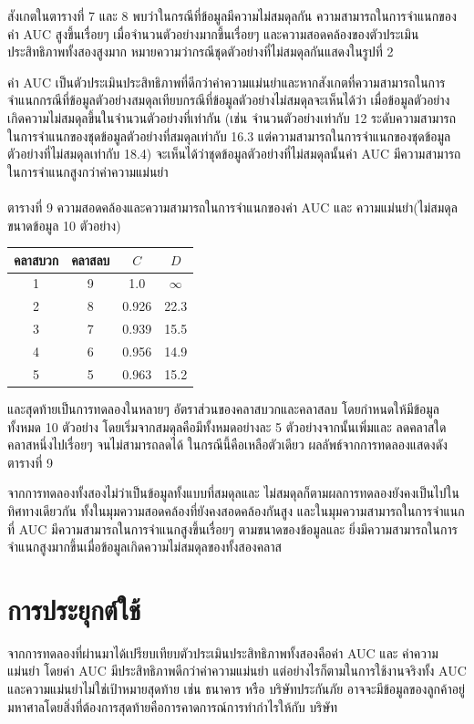 \documentclass[twoside, twocolumn, 12pt]{article}
\begin{document}
สังเกตในตารางที่ 7 และ 8 พบว่าในกรณีที่ข้อมูลมีความไม่สมดุลกัน ความสามารถในการจำแนกของค่า AUC สูงขึ้นเรื่อยๆ เมื่อจำนวนตัวอย่างมากขึ้นเรื่อยๆ และความสอดคล้องของตัวประเมินประสิทธิภาพทั้งสองสูงมาก หมายความว่ากรณีชุดตัวอย่างที่ไม่สมดุลกันแสดงในรูปที่ 2 

ค่า AUC เป็นตัวประเมินประสิทธิภาพที่ดีกว่าค่าความแม่นยำและหากสังเกตที่ความสามารถในการจำแนกกรณีที่ข้อมูลตัวอย่างสมดุลเทียบกรณีที่ข้อมูลตัวอย่างไม่สมดุลจะเห็นได้ว่า เมื่อข้อมูลตัวอย่างเกิดความไม่สมดุลขึ้นในจำนวนตัวอย่างที่เท่ากัน (เช่น จำนวนตัวอย่างเท่ากับ 12 ระดับความสามารถในการจำแนกของชุดข้อมูลตัวอย่างที่สมดุลเท่ากับ 16.3 แต่ความสามารถในการจำแนกของชุดข้อมูลตัวอย่างที่ไม่สมดุลเท่ากับ 18.4) จะเห็นได้ว่าชุดข้อมูลตัวอย่างที่ไม่สมดุลนั้นค่า AUC มีความสามารถในการจำแนกสูงกว่าค่าความแม่นยำ
\\\\
ตารางที่ 9 ความสอดคล้องและความสามารถในการจำแนกของค่า AUC และ ความแม่นยำ(ไม่สมดุล ขนาดข้อมูล 10 ตัวอย่าง)
\begin{center}
\begin{tabular}{|cccc|}
\hline
คลาสบวก & คลาสลบ & $C$ & $D$\\
\hline
1&9&1.0 &$\infty$\\\hline
2&8&0.926&22.3\\\hline
3&7&0.939&15.5\\\hline
4&6&0.956&14.9\\\hline
5&5&0.963&15.2\\\hline
\end{tabular}
\end{center}

และสุดท้ายเป็นการทดลองในหลายๆ อัตราส่วนของคลาสบวกและคลาสลบ โดยกำหนดให้มีข้อมูลทั้งหมด 10 ตัวอย่าง โดยเริ่มจากสมดุลคือมีทั้งหมดอย่างละ 5 ตัวอย่างจากนั้นเพิ่มและ ลดคลาสใดคลาสหนึ่งไปเรื่อยๆ จนไม่สามารถลดได้ ในกรณีนี้คือเหลือตัวเดียว ผลลัพธ์จากการทดลองแสดงดังตารางที่ 9

จากการทดลองทั้งสองไม่ว่าเป็นข้อมูลทั้งแบบที่สมดุลและ ไม่สมดุลก็ตามผลการทดลองยังคงเป็นไปในทิศทางเดียวกัน ทั้งในมุมความสอดคล้องที่ยังคงสอดคล้องกันสูง และในมุมความสามารถในการจำแนกที่ AUC มีความสามารถในการจำแนกสูงขึ้นเรื่อยๆ ตามขนาดของข้อมูลและ ยิ่งมีความสามารถในการจำแนกสูงมากขึ้นเมื่อข้อมูลเกิดความไม่สมดุลของทั้งสองคลาส


\section{การประยุกต์ใช้}
\quad จากการทดลองที่ผ่านมาได้เปรียบเทียบตัวประเมินประสิทธิภาพทั้งสองคือค่า AUC และ ค่าความแม่นยำ โดยค่า AUC มีประสิทธิภาพดีกว่าค่าความแม่นยำ แต่อย่างไรก็ตามในการใช้งานจริงทั้ง AUC และความแม่นยำไม่ใช่เป้าหมายสุดท้าย เช่น  ธนาคาร หรือ บริษัทประกันภัย อาจจะมีข้อมูลของลูกค้าอยู่มหาศาลโดยสิ่งที่ต้องการสุดท้ายคือการคาดการณ์การทำกำไรให้กับ บริษัท
\end{document}
